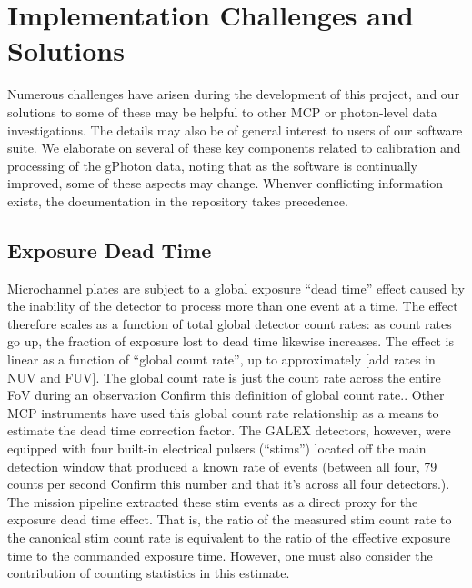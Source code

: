 \documentclass[5p]{elsarticle}
\begin{document}
\section{Implementation Challenges and Solutions}
\label{implementation}
Numerous challenges have arisen during the development of this project, and our solutions to some of these may be helpful to other MCP or photon-level data investigations. The details may also be of general interest to users of our software suite.  We elaborate on several of these key components related to calibration and processing of the gPhoton data, noting that as the software is continually improved, some of these aspects may change.  Whenver conflicting information exists, the documentation in the repository takes precedence.

\subsection{Exposure Dead Time}
\label{deadtimedesc}
Microchannel plates are subject to a global exposure ``dead time'' effect caused by the inability of the detector to process more than one event at a time. The effect therefore scales as a function of total global detector count rates: as count rates go up, the fraction of exposure lost to dead time likewise increases. The effect is linear as a function of ``global count rate'', up to approximately {\color{red}[add rates in NUV and FUV]}.  The global count rate is just the count rate across the entire FoV during an observation {\color{red} Confirm this definition of global count rate.}. Other MCP instruments have used this global count rate relationship as a means to estimate the dead time correction factor. The GALEX detectors, however, were equipped with four built-in electrical pulsers (``stims'') located off the main detection window that produced a known rate of events (between all four, 79 counts per second {\color{red}Confirm this number and that it's across all four detectors.}). The mission pipeline extracted these stim events as a direct proxy for the exposure dead time effect. That is, the ratio of the measured stim count rate to the canonical stim count rate is equivalent to the ratio of the effective exposure time to the commanded exposure time. However, one must also consider the contribution of counting statistics in this estimate.
\end{document}
